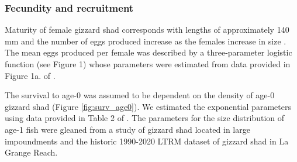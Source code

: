 \documentclass[preprint,review,12pt,authoryear]{elsarticle}
\begin{document}

\subsubsection{Fecundity and recruitment}
Maturity of female gizzard shad corresponds with lengths of approximately 140 mm and the number of eggs produced increase as the females increase in size \citep{jons1997ovarian}.  The mean eggs produced per female was described by a three-parameter logistic function (see Figure 1) whose parameters were estimated from data provided in Figure 1a. of \citep{jons1997ovarian}. 

The survival to age-0 was assumed to be dependent on the density of age-0 gizzard shad (Figure \ref{fig:surv_age0}).  We estimated the exponential parameters using data provided in Table 2 of \citep{michaletz2010overwinter}. The parameters for the size distribution of age-1 fish were gleaned from a study of gizzard shad located in large impoundments \citep{michaletz2017variation} and the historic 1990-2020 LTRM dataset of gizzard shad in La Grange Reach.
\end{document}
